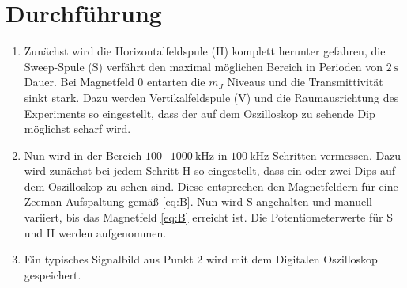 

\section{Durchführung}
	\begin{enumerate}
	\item Zunächst wird die Horizontalfeldspule (H) komplett herunter 
		gefahren, die Sweep-Spule (S) verfährt den maximal möglichen 
		Bereich in Perioden von $\SI{2}{\second}$ Dauer. Bei Magnetfeld 
		$0$ 
		entarten die $m_J$ Niveaus und 
		die Transmittivität sinkt stark. Dazu werden Vertikalfeldspule (V) 
		und die Raumausrichtung des Experiments so eingestellt, dass 
		der auf dem Oszilloskop zu sehende Dip möglichst scharf wird. 
	\item Nun wird in der Bereich $\SI{100-1000}{\kilo\hertz}$ in 
		$\SI{100}{\kilo\hertz}$ Schritten vermessen. Dazu wird zunächst 
		bei jedem Schritt H so eingestellt, dass ein oder zwei Dips 
		auf dem Oszilloskop zu sehen sind. Diese entsprechen den 
		Magnetfeldern für eine Zeeman-Aufspaltung gemäß \eqref{eq:B}. 
		Nun wird S angehalten und manuell variiert, bis das Magnetfeld 
		\eqref{eq:B} erreicht ist. Die Potentiometerwerte für S und H 
		werden aufgenommen.
	\item Ein typisches Signalbild aus Punkt 2 wird mit dem 
		Digitalen Oszilloskop gespeichert.
	\end{enumerate}